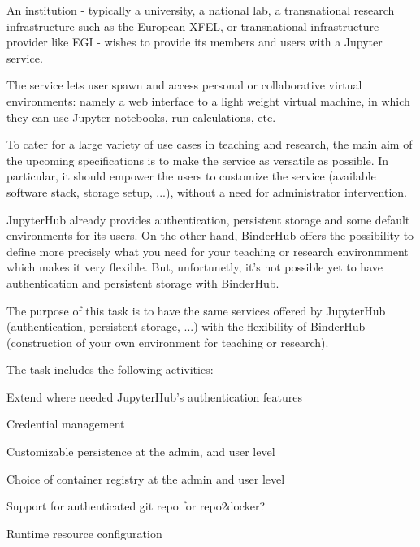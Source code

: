 \begin{task}[
  title=JupyterHub / BinderHub convergence,
  id=jh-bh-conv,
  lead=EP,
  PM=15, %
  wphases={0-48},
  partners={EP,WTT}]

  An institution - typically a university, a national lab, a transnational
  research infrastructure such as the European XFEL, or transnational 
  infrastructure provider like EGI - wishes to provide its members and 
  users with a Jupyter service.

  The service lets user spawn and access personal or collaborative virtual
  environments: namely a web interface to a light weight virtual machine,
  in which they can use Jupyter notebooks, run calculations, etc.

  
  To cater for a large variety of use cases in teaching and research,
  the main aim of the upcoming specifications is to make the service as
  versatile as possible. In particular, it should empower the users to 
  customize the service (available software stack, storage setup, ...),
  without a need for administrator intervention.

  JupyterHub already provides authentication, persistent storage and some
  default environments for its users. On the other hand, BinderHub offers
  the possibility to define more precisely what you need for your teaching
  or research environmment which makes it very flexible. But, unfortunetly,
  it's not possible yet to have authentication and persistent storage with
  BinderHub.

  The purpose of this task is to have the same services offered by JupyterHub
  (authentication, persistent storage, ...) with the flexibility of BinderHub
  (construction of your own environment for teaching or research).

  The task includes the following activities:
  \begin{compactitem}
  \item Extend where needed JupyterHub's authentication features%
  \item Credential management
  \item Customizable persistence at the admin, and user level
  \item Choice of container registry at the admin and user level %
  \item Support for authenticated git repo for repo2docker? %
  \item Runtime resource configuration %
  \end{compactitem}

\end{task}
